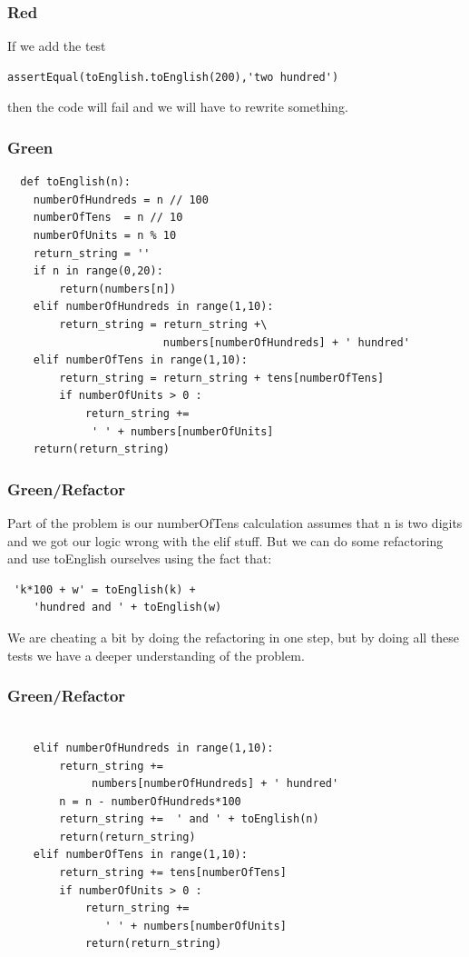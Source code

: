\documentclass{beamer}
\begin{document}
\begin{frame}[fragile]
\frametitle{Red}
If we add the test
\begin{lstlisting}
assertEqual(toEnglish.toEnglish(200),'two hundred')
\end{lstlisting}
then the code will fail and we will have to rewrite something.
\end{frame}
\begin{frame}[fragile]
\frametitle{Green}
\begin{lstlisting}
  def toEnglish(n):
    numberOfHundreds = n // 100
    numberOfTens  = n // 10
    numberOfUnits = n % 10
    return_string = ''
    if n in range(0,20):
        return(numbers[n])
    elif numberOfHundreds in range(1,10):
        return_string = return_string +\
                        numbers[numberOfHundreds] + ' hundred'
    elif numberOfTens in range(1,10):
        return_string = return_string + tens[numberOfTens]
        if numberOfUnits > 0 :
            return_string += 
             ' ' + numbers[numberOfUnits]
    return(return_string)
\end{lstlisting}

\end{frame}
\begin{frame}[fragile]
  \frametitle{Green/Refactor}
Part of the problem is our numberOfTens calculation assumes that n is
two digits and we got our logic wrong with the elif stuff. But we can
do some refactoring and use toEnglish ourselves using the fact that:
\begin{lstlisting}
 'k*100 + w' = toEnglish(k) +
    'hundred and ' + toEnglish(w)  
\end{lstlisting}

We are cheating a bit by doing the refactoring in one step, but by
doing all these tests we have a deeper understanding of the problem.

\end{frame}
\begin{frame}[fragile]
  \frametitle{Green/Refactor}
\begin{lstlisting}

    elif numberOfHundreds in range(1,10):
        return_string += 
             numbers[numberOfHundreds] + ' hundred'
        n = n - numberOfHundreds*100
        return_string +=  ' and ' + toEnglish(n)
        return(return_string)
    elif numberOfTens in range(1,10):
        return_string += tens[numberOfTens]
        if numberOfUnits > 0 :
            return_string += 
               ' ' + numbers[numberOfUnits]
            return(return_string)
  \end{lstlisting}
\end{frame}
\end{document}
